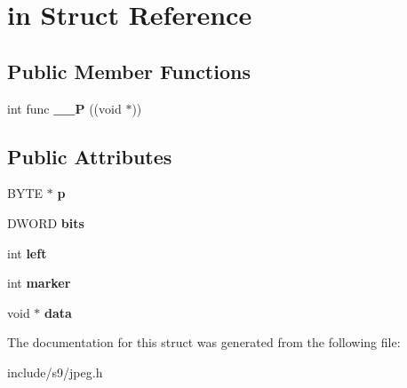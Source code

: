 \hypertarget{structin}{\section{in Struct Reference}
\label{structin}
}
\subsection*{Public Member Functions}
\begin{DoxyCompactItemize}
\item 
\hypertarget{structin_a5b579d0bc7c628f2f54c830588870bde}{int func {\bfseries \-\_\-\-\_\-\-P} ((void $\ast$))}\label{structin_a5b579d0bc7c628f2f54c830588870bde}

\end{DoxyCompactItemize}
\subsection*{Public Attributes}
\begin{DoxyCompactItemize}
\item 
\hypertarget{structin_a473dfe1bcb6314abd17d50c61a83ec80}{B\-Y\-T\-E $\ast$ {\bfseries p}}\label{structin_a473dfe1bcb6314abd17d50c61a83ec80}

\item 
\hypertarget{structin_a1a5143f47a3260569f20a5df3c2b9af2}{D\-W\-O\-R\-D {\bfseries bits}}\label{structin_a1a5143f47a3260569f20a5df3c2b9af2}

\item 
\hypertarget{structin_ae936267e9dc755c6603765fe3a24c6b7}{int {\bfseries left}}\label{structin_ae936267e9dc755c6603765fe3a24c6b7}

\item 
\hypertarget{structin_a18f3590ff3e1875cb36250d51eb1860d}{int {\bfseries marker}}\label{structin_a18f3590ff3e1875cb36250d51eb1860d}

\item 
\hypertarget{structin_a7d0698d52948ac4427e4133655fc47cc}{void $\ast$ {\bfseries data}}\label{structin_a7d0698d52948ac4427e4133655fc47cc}

\end{DoxyCompactItemize}


The documentation for this struct was generated from the following file\-:\begin{DoxyCompactItemize}
\item 
include/s9/jpeg.\-h\end{DoxyCompactItemize}
